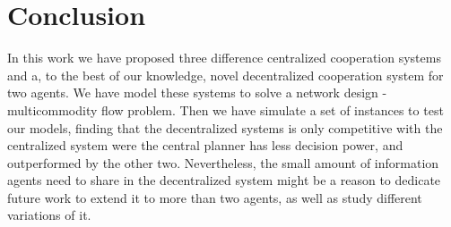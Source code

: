 \documentclass{article}
\begin{document}
\section{Conclusion} \label{seq:conclusion}

In this work we have proposed three difference centralized cooperation systems and a, to the best of our knowledge, novel decentralized cooperation system for two agents. We have model these systems to solve a network design - multicommodity flow problem. Then we have simulate a set of instances to test our models, finding that the decentralized systems is only competitive with the centralized system were the central planner has less decision power, and outperformed by the other two. Nevertheless, the small amount of information agents need to share in the decentralized system might be a reason to dedicate future work to extend it to more than two agents, as well as study different variations of it. 

\printbibliography
\end{document}
